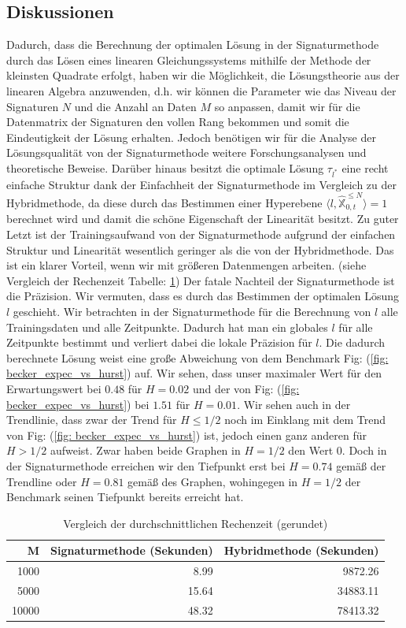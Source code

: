\documentclass[12pt,titlepage,headsepline]{article}
\begin{document}
      \subsection{Diskussionen}
      Dadurch, dass die Berechnung der optimalen Lösung in der Signaturmethode durch das Lösen eines linearen Gleichungssystems mithilfe der Methode der kleinsten Quadrate erfolgt, haben wir die Möglichkeit, die Lösungstheorie aus der linearen Algebra anzuwenden, d.h. wir können die Parameter wie das Niveau der Signaturen $N$ und die Anzahl an Daten $M$ so anpassen, damit wir für die Datenmatrix der Signaturen den vollen Rang bekommen und somit die Eindeutigkeit der Lösung erhalten. Jedoch benötigen wir für die Analyse der Lösungsqualität von der Signaturmethode weitere Forschungsanalysen und theoretische Beweise. Darüber hinaus besitzt die optimale Lösung $\tau_{l^*}$ eine recht einfache Struktur dank der Einfachheit der Signaturmethode im Vergleich zu der Hybridmethode, da diese durch das Bestimmen einer Hyperebene $\langle l,\hat{\mathbb{X}}^{\leq N}_{0,t}\rangle = 1$ berechnet wird und damit die schöne Eigenschaft der Linearität besitzt. Zu guter Letzt ist der Trainingsaufwand von der Signaturmethode aufgrund der einfachen Struktur und Linearität wesentlich geringer als die von der Hybridmethode. Das ist ein klarer Vorteil, wenn wir mit größeren Datenmengen arbeiten. (siehe Vergleich der Rechenzeit Tabelle: \ref{tbl:vergleich_rechenzeit})
      \hfill\break
      Der fatale Nachteil der Signaturmethode ist die Präzision. Wir vermuten, dass es durch das Bestimmen der optimalen Lösung $l$ geschieht. Wir betrachten in der Signaturmethode für die Berechnung von $l$ alle Trainingsdaten und alle Zeitpunkte. Dadurch hat man ein globales $l$ für alle Zeitpunkte bestimmt und verliert dabei die lokale Präzision für $l$. Die dadurch berechnete Lösung weist eine große Abweichung von dem Benchmark Fig: (\ref{fig: becker_expec_vs_hurst}) auf. Wir sehen, dass unser maximaler Wert für den Erwartungswert bei $0.48$ für $H=0.02$ und der von Fig: (\ref{fig: becker_expec_vs_hurst}) bei $1.51$ für $H=0.01$. Wir sehen auch in der Trendlinie, dass zwar der Trend für
      $H\leq1/2$ noch im Einklang mit dem Trend von Fig: (\ref{fig: becker_expec_vs_hurst}) ist, jedoch einen ganz anderen für $H>1/2$ aufweist. Zwar haben beide Graphen in $H=1/2$ den Wert $0$. Doch in der Signaturmethode erreichen wir den Tiefpunkt erst bei $H=0.74$ gemäß der Trendline oder $H=0.81$ gemäß des Graphen, wohingegen in $H=1/2$ der Benchmark seinen Tiefpunkt bereits erreicht hat.
      \begin{table}[H]
        \caption{Vergleich der durchschnittlichen Rechenzeit (gerundet)}
        \centering
        \begin{tabular}{rrr}
          \midrule
          M & Signaturmethode (Sekunden) & Hybridmethode (Sekunden) \\
          \toprule
          1000 & 8.99 & 9872.26 \\
          5000 & 15.64 & 34883.11 \\
          10000 & 48.32 & 78413.32 \\
          \midrule
        \end{tabular}
        \label{tbl:vergleich_rechenzeit}
      \end{table}
\end{document}
